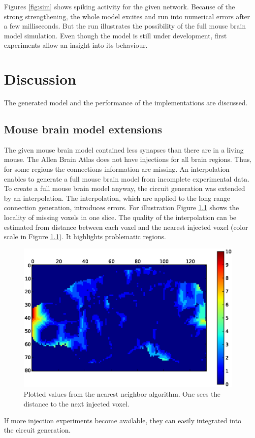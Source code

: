 Figures \ref{fig:sim} shows spiking activity for the given network.
Because of the strong strengthening, the whole model excites and run into numerical errors
after a few milliseconds. But the run illustrates the possibility of the full mouse brain model
simulation. Even though the model is still under development, first experiments allow an insight 
into its behaviour.


\chapter{Discussion}
The generated model and the performance of the implementations are discussed.

\section{Mouse brain model extensions}
The given mouse brain model contained less synapses than there are in a living mouse.
The Allen Brain Atlas does not have injections for all brain regions.
Thus, for some regions the connections information are missing.
An interpolation enables to generate a full mouse brain model from incomplete experimental data.
To create a full mouse brain model anyway, the circuit generation was extended by an interpolation.
The interpolation, which are applied to the long range connection generation, introduces errors.
For illustration Figure \ref{interpolationdistance} shows the locality of missing voxels in one slice.
The quality of the interpolation can be estimated from distance between each voxel and the nearest injected voxel (color scale in Figure \ref{interpolationdistance}).
It highlights problematic regions.
\begin{figure}[ht!]
\centering
\includegraphics[scale=0.5]{pictures/distance_x_y_70.eps}
\caption[Plotted values from the nearest neighbor algorithm]{Plotted values from the nearest neighbor algorithm. One sees the distance to the next injected voxel.}
\label{interpolationdistance}
\end{figure}
If more injection experiments become available, they can easily integrated into
the circuit generation.



